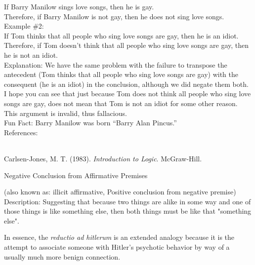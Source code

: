 \documentclass[a4paper,12pt,single,pdftex]{scrartcl}
\begin{document}
    
      If Barry Manilow sings love songs, then he is gay.
    \\

    
      Therefore, if Barry Manilow is not gay, then he does not sing love songs.
    \\

    
      Example \#2:
    \\

    
      If Tom thinks that all people who sing love songs are gay, then he is an idiot.
    \\

    
      Therefore, if Tom doesn’t think that all people who sing love songs are gay, then he is not an idiot.
    \\

    
      Explanation: We have the same problem with the failure to transpose the antecedent (Tom thinks that all people who sing love songs are gay) with the consequent (he is an idiot) in the conclusion, although we did negate them both.  I hope you can see that just because Tom does not think all people who sing love songs are gay, does not mean that Tom is not an idiot for some other reason.  This argument is invalid, thus fallacious.
    \\

    
      Fun Fact: Barry Manilow was born “Barry Alan Pincus.”
    \\

    References:

    
      
        
      \\

      
        
          Carlsen-Jones, M. T. (1983). {\it Introduction to Logic}. McGraw-Hill.
        
      
    
  

Negative Conclusion from Affirmative Premises
    
      (also known as: illicit affirmative, Positive conclusion from negative premise)
    \\

  
    Description: Suggesting that because two things are alike in some way and one of those things is like something else, then both things must be like that "something else".

    
      In essence, the {\it reductio ad hitlerum} is an extended analogy because it is the attempt to associate someone with Hitler’s psychotic behavior by way of a usually much more benign connection.
    \\
\end{document}
